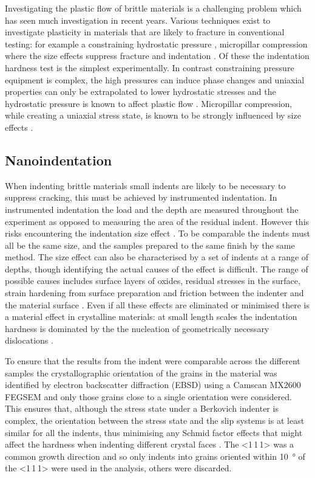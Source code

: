 Investigating the plastic flow of brittle materials is a challenging problem which has seen much investigation in recent years. Various techniques exist to investigate plasticity in materials that are likely to fracture in conventional testing: for example a constraining hydrostatic pressure \cite{Griggs1936,Weinrich1975,Borvin1990}, micropillar compression where the size effects suppress fracture \cite{Uchic2004} and indentation \cite{Cripps2011,tabor2000hardness,Marsh1964,Korte2009}. Of these the indentation hardness test is the simplest experimentally. In contrast constraining pressure equipment is complex, the high pressures can induce phase changes and uniaxial properties can only be extrapolated to lower hydrostatic stresses and the hydrostatic pressure is known to affect plastic flow \cite{frost1982pressure}. Micropillar compression, while creating a uniaxial stress state, is known to be strongly influenced by size effects \cite{Uchic2004,Greer2005,Greer2006corrigendum}.


\subsection{Nanoindentation}

When indenting brittle materials small indents are likely to be necessary to suppress cracking, this must be achieved by instrumented indentation. In instrumented indentation the load and the depth are measured throughout the experiment as opposed to measuring the area of the residual indent. However this risks encountering the indentation size effect \cite{Korte2009,Cripps2011}. To be comparable the indents must all be the same size, and the samples prepared to the same finish by the same method. The size effect can also be characterised by a set of indents at a range of depths, though identifying the actual causes of the effect is difficult. The range of possible causes includes  surface layers of oxides, residual stresses in the surface, strain hardening from surface preparation and friction between the indenter and the material surface \cite{Cripps2011}. Even if all these effects are eliminated or minimised there is a material effect in crystalline materials: at small length scales the indentation hardness is dominated by the the nucleation of geometrically necessary dislocations \cite{Cripps2011}.






To ensure that the results from the indent were comparable across the different samples the crystallographic orientation of the grains in the material was identified by electron backscatter diffraction (EBSD) using a Camscan MX2600 FEGSEM and only those grains close to a single orientation were considered. This ensures that, although the stress state under a Berkovich indenter is complex, the orientation between the stress state and the slip systems is at least similar for all the indents, thus minimising any Schmid factor effects that might affect the hardness when indenting different crystal faces \cite{Kelly2012ch7}. The <1\,1\,1> was a common growth direction and so only indents into grains oriented within \SI{10}{\degree} of the <1\,1\,1> were used in the analysis, others were discarded.


